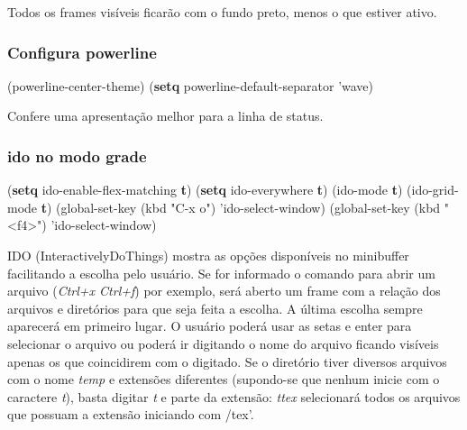 \documentclass[]{article}
\newenvironment{Shaded}{}{}
\newcommand{\KeywordTok}[1]{\textcolor[rgb]{0.00,0.44,0.13}{\textbf{{#1}}}}
\newcommand{\StringTok}[1]{\textcolor[rgb]{0.25,0.44,0.63}{{#1}}}
\newcommand{\NormalTok}[1]{{#1}}
\begin{document}
Todos os frames visíveis ficarão com o fundo preto, menos o que estiver
ativo.

\subsubsection{Configura powerline}\label{configura-powerline}

\begin{Shaded}
\begin{Highlighting}[]
\NormalTok{(powerline-center-theme)}
\NormalTok{(}\KeywordTok{setq} \NormalTok{powerline-default-separator}
      \NormalTok{'wave)}
\end{Highlighting}
\end{Shaded}

Confere uma apresentação melhor para a linha de status.

\subsubsection{ido no modo grade}\label{ido-no-modo-grade}

\begin{Shaded}
\begin{Highlighting}[]
\NormalTok{(}\KeywordTok{setq} \NormalTok{ido-enable-flex-matching }\KeywordTok{t}\NormalTok{)}
\NormalTok{(}\KeywordTok{setq} \NormalTok{ido-everywhere }\KeywordTok{t}\NormalTok{)}
\NormalTok{(ido-mode }\KeywordTok{t}\NormalTok{)}
\NormalTok{(ido-grid-mode }\KeywordTok{t}\NormalTok{)}
\NormalTok{(global-set-key (kbd }\StringTok{"C-x o"}\NormalTok{) 'ido-select-window)}
\NormalTok{(global-set-key (kbd }\StringTok{"<f4>"}\NormalTok{) 'ido-select-window)}
\end{Highlighting}
\end{Shaded}

IDO (InteractivelyDoThings) mostra as opções disponíveis no minibuffer
facilitando a escolha pelo usuário. Se for informado o comando para
abrir um arquivo (\emph{Ctrl+x Ctrl+f}) por exemplo, será aberto um
frame com a relação dos arquivos e diretórios para que seja feita a
escolha. A última escolha sempre aparecerá em primeiro lugar. O usuário
poderá usar as setas e enter para selecionar o arquivo ou poderá ir
digitando o nome do arquivo ficando visíveis apenas os que coincidirem
com o digitado. Se o diretório tiver diversos arquivos com o nome
\emph{temp} e extensões diferentes (supondo-se que nenhum inicie com o
caractere \emph{t}), basta digitar \emph{t} e parte da extensão:
\emph{ttex} selecionará todos os arquivos que possuam a extensão
iniciando com /tex'.
\end{document}
